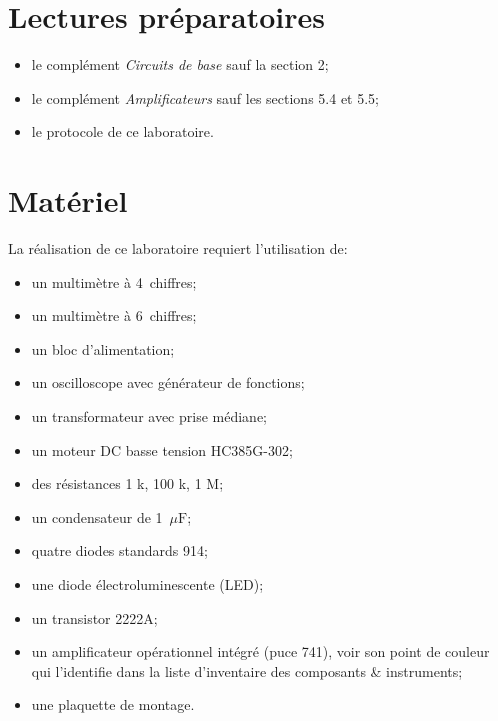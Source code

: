 \documentclass[canadien,12pt,oneside,letterpaper]{article}
\begin{document}

\section[Lectures préparatoires]{Lectures préparatoires} \label{sec:prep}

\begin{itemize} \itemsep4pt
\item le complément \textit{Circuits de base} sauf la section 2;
\item le complément \textit{Amplificateurs} sauf les sections 5.4 et 5.5;
\item le protocole de ce laboratoire.
\end{itemize}
\vspace{1ex}
\noindent{}

\section{Matériel}

\noindent La réalisation de ce laboratoire requiert l'utilisation de:
\vspace{1ex}
\begin{itemize} \itemsep4pt
\item un multimètre à 4\textonehalf~chiffres;
\item un multimètre à 6\textonehalf~chiffres;
\item un bloc d'alimentation;
\item un oscilloscope avec générateur de fonctions;
\item un transformateur avec prise médiane;
\item un moteur DC basse tension HC385G-302;
\item des résistances 1 k\omega , 100 k\omega, 1 M\omega; %
\item un condensateur de 1~$\mu\mathrm{F}$;
\item quatre diodes standards 914;
\item une diode électroluminescente (LED);
\item un transistor 2222A;
\item un amplificateur opérationnel intégré (puce 741), voir son point de couleur qui l'identifie dans la liste d'inventaire des composants \& instruments;
\item une plaquette de montage.
\end{itemize}
\end{document}
